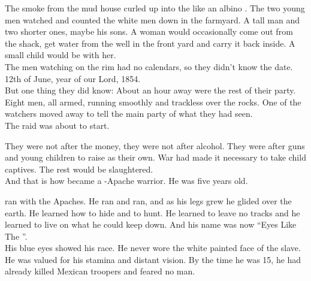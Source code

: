 The smoke from the mud house curled up into the  like an albino . The two young men watched and counted the white men down in the farmyard. A tall man and two shorter ones, maybe his sons. A woman would occasionally come out from the shack, get water from the well in the front yard and carry it back inside. A small child would be with her. \\

The men watching on the rim had no calendars, so they didn't know the date. 12th of June, year of our Lord, 1854. \\

But one thing they did know: About an hour away were the rest of their party. Eight men, all armed, running smoothly and trackless over the rocks. One of the watchers moved away to tell the main party of what they had seen. \\

The raid was about to start. \\




They were not after the money, they were not after alcohol. They were after guns and young children to raise as their own. War had made it necessary to take child captives. The rest would be slaughtered. \\

And that is how  became a -Apache warrior.
He was five years old. \\





 ran with the Apaches. He ran and ran, and as his legs grew he glided over the  earth. He learned how to hide and to hunt. He learned to leave no tracks and he learned to live on what he could keep down. And his name was now ``Eyes Like The ''. \\

His blue eyes showed his  race. He never wore the white painted face of the slave. He was valued for his stamina and distant vision. By the time he was 15, he had already killed Mexican troopers and feared no man. \\

